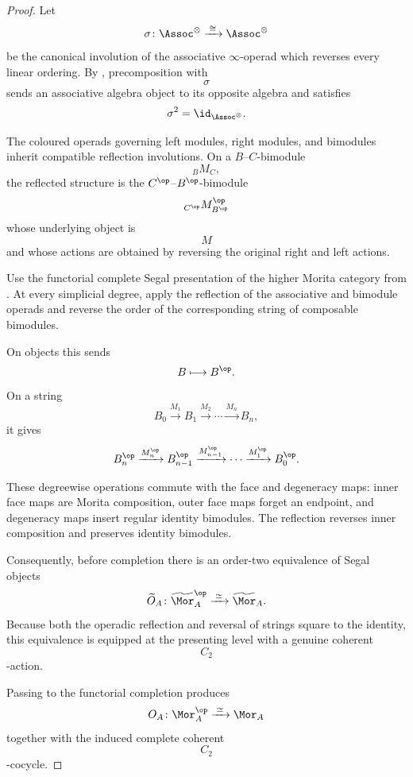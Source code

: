 \begin{proof}
Let
\[
    \sigma
    \colon
    \Assoc^\otimes
    \xrightarrow{\;\cong\;}
    \Assoc^\otimes
\]
be the canonical involution of the associative $\infty$-operad which
reverses every linear ordering. By
\cite[Remark~4.1.1.7]{LurieHigherAlgebra},
precomposition with
\[
    \sigma
\]
sends an associative algebra object to its opposite algebra and satisfies
\[
    \sigma^2
    =
    \id_{\Assoc^\otimes}.
\]

The coloured operads governing left modules, right modules, and
bimodules inherit compatible reflection involutions. On a
$B$--$C$-bimodule
\[
    {}_B M_C,
\]
the reflected structure is the
$C^{\op}$--$B^{\op}$-bimodule
\[
    {}_{C^{\op}}M^{\op}_{B^{\op}}
\]
whose underlying object is
\[
    M
\]
and whose actions are obtained by reversing the original right and left
actions.

Use the functorial complete Segal presentation of the higher Morita
category from
\cite[Remark~5.32 and Corollary~5.37]{HaugsengHigherMorita}.
At every simplicial degree, apply the reflection of the associative and
bimodule operads and reverse the order of the corresponding string of
composable bimodules.

On objects this sends
\[
    B
    \longmapsto
    B^{\op}.
\]
On a string
\[
    B_0
    \xrightarrow{M_1}
    B_1
    \xrightarrow{M_2}
    \cdots
    \xrightarrow{M_n}
    B_n,
\]
it gives
\[
    B_n^{\op}
    \xrightarrow{M_n^{\op}}
    B_{n-1}^{\op}
    \xrightarrow{M_{n-1}^{\op}}
    \cdots
    \xrightarrow{M_1^{\op}}
    B_0^{\op}.
\]

These degreewise operations commute with the face and degeneracy maps:
inner face maps are Morita composition, outer face maps forget an
endpoint, and degeneracy maps insert regular identity bimodules. The
reflection reverses inner composition and preserves identity
bimodules.

Consequently, before completion there is an order-two equivalence of
Segal objects
\[
    \widetilde O_A
    \colon
    \widetilde{\Mor}_A^{\op}
    \xrightarrow{\;\simeq\;}
    \widetilde{\Mor}_A.
\]
Because both the operadic reflection and reversal of strings square to
the identity, this equivalence is equipped at the presenting level with
a genuine coherent
\[
    C_2
\]
-action.

Passing to the functorial completion produces
\[
    O_A
    \colon
    \Mor_A^{\op}
    \xrightarrow{\;\simeq\;}
    \Mor_A
\]
together with the induced complete coherent
\[
    C_2
\]
-cocycle.


\end{proof}
